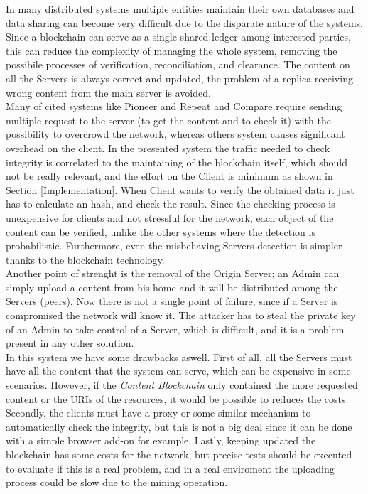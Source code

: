 \documentclass[conference,compsoc]{IEEEtran}
\begin{document}
In many distributed systems multiple entities maintain their own databases and data sharing can become very difficult due to the disparate nature of the systems. Since a blockchain can serve as a single shared ledger among interested parties, this can reduce the complexity of managing the whole system, removing the possibile processes of verification, reconciliation, and clearance. The content on all the Servers is always correct and updated, the problem of a replica receiving wrong content from the main server is avoided.\\
Many of cited systems like Pioneer \cite{seshadri2005pioneer} and Repeat and Compare \cite{michalakis2007ensuring} require sending multiple request to the server (to get the content and to check it) with the possibility to overcrowd the network, whereas others system causes significant overhead on the client. In the presented system the traffic needed to check integrity is correlated to the maintaining of the blockchain itself, which should not be really relevant, and the effort on the Client is minimum as shown in Section \ref{Implementation}. When Client wants to verify the obtained data it just has to calculate an hash, and check the result. Since the checking process is unexpensive for clients and not stressful for the network, each object of the content can be verified, unlike the other systems where the detection is probabilistic. Furthermore, even the misbehaving Servers detection is simpler thanks to the blockchain technology. 
\\
Another point of strenght is the removal of the Origin Server; an Admin can simply upload a content from his home and it will be distributed among the Servers (peers). Now there is not a single point of failure, since if a Server is compromised the network will know it.  The attacker has to steal the private key of an Admin to take control of a Server, which is difficult, and it is a problem present in any other solution.
\\In this system we have some drawbacks aswell. First of all, all the Servers must have all the content that the system can serve, which can be expensive in some scenarios. However, if the \textit{Content Blockchain} only contained the more requested content or the URIs of the resources, it would be possible to reduces the costs. Secondly, the clients must have a proxy or some similar mechanism to automatically check the integrity, but this is not a big deal since it can be done with a simple browser add-on for example. Lastly, keeping updated the blockchain has some costs for the network, but precise tests should be executed to evaluate if this is a real problem, and in a real enviroment the uploading process could be slow due to the mining operation.
\end{document}
